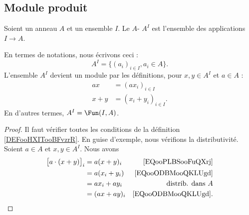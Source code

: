 \subsection{Module produit}

\begin{lemmaDef}        \label{DEFooLCJEooBvVmkV}
	Soient un anneau \( A\) et un ensemble \( I\). Le \( A\)- \( A^I\) est l'ensemble des applications \( I\to A\).

	En termes de notations, nous écrivons ceci :
	\begin{equation}
		A^I=\{ (a_i)_{i\in I},a_i\in A \}.
	\end{equation}
	L'ensemble \( A^I\) devient un module par les définitions, pour \( x,y\in A^I\) et \( a\in A\) :
	\begin{subequations}
		\begin{align}
			ax  & =(ax_i)_{i\in I}        \label{EQooPLBSooFuQXrj}  \\
			x+y & =(x_i+y_i)_{i\in I}     \label{EQooODBMooQKLUgd}.
		\end{align}
	\end{subequations}
	En d'autres termes, \( A^I=\Fun(I,A)\).
\end{lemmaDef}

\begin{proof}
	Il faut vérifier toutes les conditions de la définition \ref{DEFooHXITooBFvzrR}. En guise d'exemple, nous vérifions la distributivité. Soient \( a\in A\) et \( x,y\in A^I\). Nous avons
	\begin{subequations}
		\begin{align}
			\big[  a\cdot(x+y)  \big]_i & =a(x+y)_i   & \text{\eqref{EQooPLBSooFuQXrj}}  \\
			                            & =a(x_i+y_i) & \text{\eqref{EQooODBMooQKLUgd}}  \\
			                            & =ax_i+ay_i  & \text{distrib. dans \( A\)}      \\
			                            & =(ax+ay)_i  & \text{\eqref{EQooODBMooQKLUgd}}.
		\end{align}
	\end{subequations}
\end{proof}

